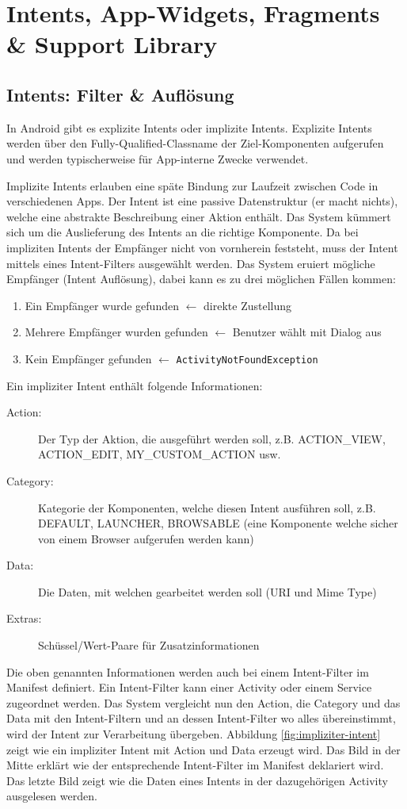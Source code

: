 \chapter{Intents, App-Widgets, Fragments \& Support Library}

\section{Intents: Filter \& Auflösung}

In Android gibt es explizite Intents oder implizite Intents. Explizite Intents werden über den Fully-Qualified-Classname der Ziel-Komponenten aufgerufen und werden typischerweise für App-interne Zwecke verwendet. 

Implizite Intents erlauben eine späte Bindung zur Laufzeit zwischen Code in verschiedenen Apps. Der Intent ist eine passive Datenstruktur (er macht nichts), welche eine abstrakte Beschreibung einer Aktion enthält. Das System kümmert sich um die Auslieferung des Intents an die richtige Komponente.
Da bei impliziten Intents der Empfänger nicht von vornherein feststeht, muss der Intent mittels eines Intent-Filters ausgewählt werden. Das System eruiert mögliche Empfänger (Intent Auflösung), dabei kann es zu drei möglichen Fällen kommen:
\begin{enumerate}
	\item Ein Empfänger wurde gefunden $\leftarrow$ direkte Zustellung
	\item Mehrere Empfänger wurden gefunden $\leftarrow$ Benutzer wählt mit Dialog aus
	\item Kein Empfänger gefunden $\leftarrow$ \texttt{ActivityNotFoundException}
\end{enumerate}
Ein impliziter Intent enthält folgende Informationen:
\begin{description}
	\item[Action:] Der Typ der Aktion, die ausgeführt werden soll, z.B. ACTION\_VIEW, ACTION\_EDIT, MY\_CUSTOM\_ACTION usw.
	\item[Category:] Kategorie der Komponenten, welche diesen Intent ausführen soll, z.B. DEFAULT, LAUNCHER, BROWSABLE (eine Komponente welche sicher von einem Browser aufgerufen werden kann)
	\item[Data:] Die Daten, mit welchen gearbeitet werden soll (URI und Mime Type)
	\item[Extras:] Schüssel/Wert-Paare für Zusatzinformationen
\end{description}
Die oben genannten Informationen werden auch bei einem Intent-Filter im Manifest definiert. Ein Intent-Filter kann einer Activity oder einem Service zugeordnet werden. Das System vergleicht nun den Action, die Category und das Data mit den Intent-Filtern und an dessen Intent-Filter wo alles übereinstimmt, wird der Intent zur Verarbeitung übergeben. Abbildung \ref{fig:impliziter-intent} zeigt wie ein impliziter Intent mit Action und Data erzeugt wird. Das Bild in der Mitte erklärt wie der entsprechende Intent-Filter im Manifest deklariert wird. Das letzte Bild zeigt wie die Daten eines Intents in der dazugehörigen Activity ausgelesen werden.
